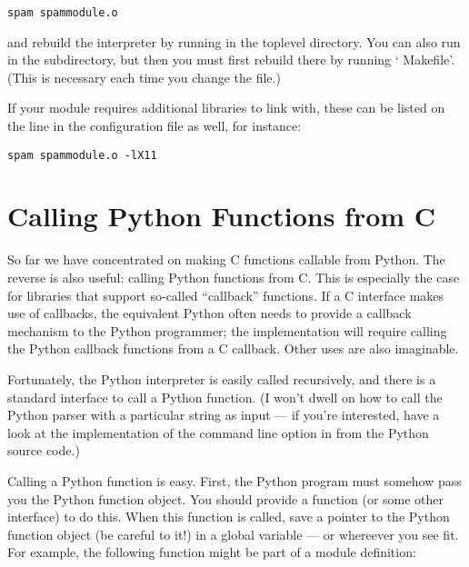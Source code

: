 \documentclass{manual}
\begin{document}
\begin{verbatim}
spam spammodule.o
\end{verbatim}

and rebuild the interpreter by running  in the toplevel
directory.  You can also run  in the 
subdirectory, but then you must first rebuild 
there by running ` Makefile'.  (This is necessary each
time you change the  file.)

If your module requires additional libraries to link with, these can
be listed on the line in the configuration file as well, for instance:

\begin{verbatim}
spam spammodule.o -lX11
\end{verbatim}

\section{Calling Python Functions from C
         \label{callingPython}}

So far we have concentrated on making C functions callable from
Python.  The reverse is also useful: calling Python functions from C.
This is especially the case for libraries that support so-called
``callback'' functions.  If a C interface makes use of callbacks, the
equivalent Python often needs to provide a callback mechanism to the
Python programmer; the implementation will require calling the Python
callback functions from a C callback.  Other uses are also imaginable.

Fortunately, the Python interpreter is easily called recursively, and
there is a standard interface to call a Python function.  (I won't
dwell on how to call the Python parser with a particular string as
input --- if you're interested, have a look at the implementation of
the  command line option in  from
the Python source code.)

Calling a Python function is easy.  First, the Python program must
somehow pass you the Python function object.  You should provide a
function (or some other interface) to do this.  When this function is
called, save a pointer to the Python function object (be careful to
 it!) in a global variable --- or whereever you
see fit. For example, the following function might be part of a module
definition:
\end{document}
